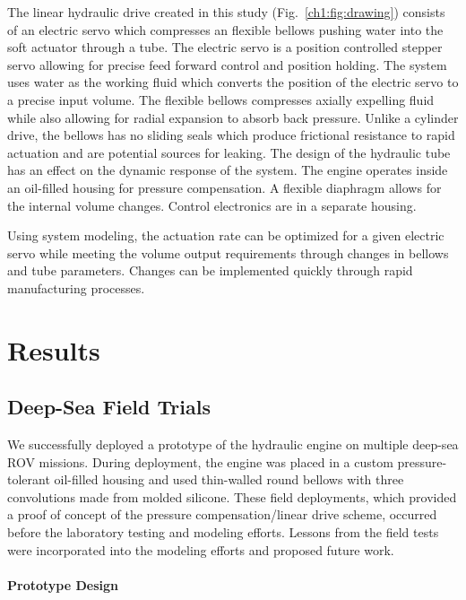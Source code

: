 The linear hydraulic drive created in this study (Fig.~\ref{ch1:fig:drawing}) consists of an
electric servo which compresses an flexible bellows pushing water into
the soft actuator through a tube. The electric servo is a position
controlled stepper servo allowing for precise feed forward control and
position holding. The system uses water as the working fluid which
converts the position of the electric servo to a precise input volume.
The flexible bellows compresses axially expelling fluid while also
allowing for radial expansion to absorb back pressure. Unlike a cylinder
drive, the bellows has no sliding seals which produce frictional
resistance to rapid actuation and are potential sources for leaking. The
design of the hydraulic tube has an effect on the dynamic response of
the system. The engine operates inside an oil-filled housing for pressure
compensation. A flexible diaphragm allows for the internal volume
changes. Control electronics are in a separate  housing.

Using system modeling, the actuation rate can be optimized for a
given electric servo while meeting the volume output requirements
through changes in bellows and tube parameters. Changes can be
implemented quickly through rapid manufacturing processes.

\hypertarget{ch1:results}{%
\section{Results}\label{ch1:results}}


\hypertarget{ch1:deep-sea-field-trials}{%
\subsection{Deep-Sea Field Trials}\label{ch1:deep-sea-field-trials}}

We successfully deployed a prototype of the hydraulic engine on multiple deep-sea \gls{ROV}
missions. During deployment, the engine was placed in a custom
pressure-tolerant oil-filled housing and used thin-walled round bellows
with three convolutions made from molded silicone. These field
deployments, which provided a proof of concept of the pressure compensation/linear drive scheme, occurred before the laboratory testing and modeling efforts. Lessons from the field tests were incorporated into the modeling efforts and proposed future work.


\hypertarget{ch1:prototype-design}{%
\paragraph{Prototype Design}\label{ch1:prototype-design}}

